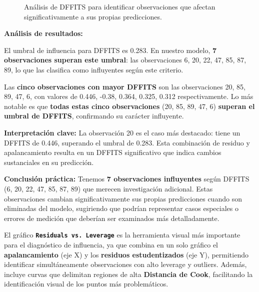 \documentclass[
  letterpaper,
  DIV=11,
  numbers=noendperiod]{scrreprt}
\begin{document}
\begin{tcolorbox}
\begin{figure}[H]
{}

\caption{\label{fig-dffits}Análisis de DFFITS para identificar
observaciones que afectan significativamente a sus propias
predicciones.}

\end{figure}%

\textbf{Análisis de resultados:}

El umbral de influencia para DFFITS es 0.283. En nuestro modelo,
\textbf{7 observaciones superan este umbral}: las observaciones 6, 20,
22, 47, 85, 87, 89, lo que las clasifica como influyentes según este
criterio.

Las \textbf{cinco observaciones con mayor \textbar DFFITS\textbar{}} son
las observaciones 20, 85, 89, 47, 6, con valores de 0.446, -0.38, 0.364,
0.325, 0.312 respectivamente. Lo más notable es que \textbf{todas estas
cinco observaciones} (20, 85, 89, 47, 6) \textbf{superan el umbral de
DFFITS}, confirmando su carácter influyente.

\textbf{Interpretación clave:} La observación 20 es el caso más
destacado: tiene un DFFITS de 0.446, superando el umbral de 0.283. Esta
combinación de residuo y apalancamiento resulta en un DFFITS
significativo que indica cambios sustanciales en su predicción.

\textbf{Conclusión práctica:} Tenemos \textbf{7 observaciones
influyentes} según DFFITS (6, 20, 22, 47, 85, 87, 89) que merecen
investigación adicional. Estas observaciones cambian significativamente
sus propias predicciones cuando son eliminadas del modelo, sugiriendo
que podrían representar casos especiales o errores de medición que
deberían ser examinados más detalladamente.

\end{tcolorbox}

El gráfico \textbf{\texttt{Residuals\ vs.\ Leverage}} es la herramienta
visual más importante para el diagnóstico de influencia, ya que combina
en un solo gráfico el \textbf{apalancamiento} (eje X) y los
\textbf{residuos estudentizados} (eje Y), permitiendo identificar
simultáneamente observaciones con alto leverage y outliers. Además,
incluye curvas que delimitan regiones de alta \textbf{Distancia de
Cook}, facilitando la identificación visual de los puntos más
problemáticos.
\end{document}
